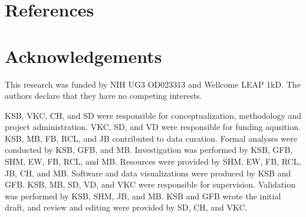 \documentclass{article}
\begin{document}
\section*{References}

\printbibliography

\section*{Acknowledgements}

This research was funded by NIH UG3 OD023313 and Wellcome LEAP 1kD.
The authors declare that they have no competing interests.


KSB, VKC, CH, and SD were responsible for conceptualization,
methodology and project administration.
VKC, SD, and VD were responsible for funding aqusition.
KSB, MB, FB, RCL, and JB contributed to data curation.
Formal analyses were conducted by KSB, GFB, and MB.
Investigation was performed by KSB, GFB, SHM, EW, FB, RCL, and MB.
Resources were provided by SHM, EW, FB, RCL, JB, CH, and MB.
Software and data visualizations were produced by KSB and GFB.
KSB, MB, SD, VD, and VKC were responsible for supervision.
Validation was performed by KSB, SHM, JB, and MB.
KSB and GFB wrote the initial draft, 
and review and editing were provided by SD, CH, and VKC.
\end{document}

